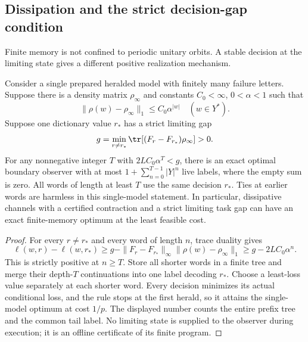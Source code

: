 \subsection{Dissipation and the strict decision-gap condition}
Finite memory is not confined to periodic unitary orbits. A stable decision at the limiting state gives a different positive realization mechanism.

\begin{proposition}\label{prop:contractive-boundary}
Consider a single prepared heralded model with finitely many failure letters. Suppose there is a density matrix $\rho_\infty$ and constants $C_0<\infty$, $0<\alpha<1$ such that
\[
 \|\rho(w)-\rho_\infty\|_1\le C_0\alpha^{|w|}
                \quad(w\in Y^*).
\]
Suppose one dictionary value $r_*$ has a strict limiting gap
\[
 g=\min_{r\ne r_*}\tr[(F_r-F_{r_*})\rho_\infty]>0.
\]
For any nonnegative integer $T$ with $2LC_0\alpha^T<g$, there is an exact optimal boundary observer with at most
$1+\sum_{n=0}^{T-1}|Y|^n$ live labels, where the empty sum is zero. All words of length at least $T$ use the same decision $r_*$. Ties at earlier words are harmless in this single-model statement. In particular, dissipative channels with a certified contraction and a strict limiting task gap can have an exact finite-memory optimum at the least feasible cost.
\end{proposition}
\begin{proof}
For every $r\ne r_*$ and every word of length $n$, trace duality gives
\[
 \ell(w,r)-\ell(w,r_*)
 \ge g-\|F_r-F_{r_*}\|_\infty
                    \|\rho(w)-\rho_\infty\|_1
 \ge g-2LC_0\alpha^n.
\]
This is strictly positive at $n\ge T$. Store all shorter words in a finite tree and merge their depth-$T$ continuations into one label decoding $r_*$. Choose a least-loss value separately at each shorter word. Every decision minimizes its actual conditional loss, and the rule stops at the first herald, so it attains the single-model optimum at cost $1/p$. The displayed number counts the entire prefix tree and the common tail label. No limiting state is supplied to the observer during execution; it is an offline certificate of its finite program.
\end{proof}

